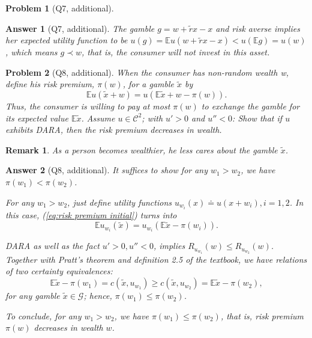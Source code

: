 \documentclass{article}
\newtheorem*{ans}{Answer}
\newtheorem*{prob}{{\bf Problem}}
\newtheorem{rem}{\bf Remark}
\newcommand{\1}{{\bf 1}}
\newcommand{\bbE}{\mathbb{E}}
\newcommand{\cC}{\mathcal{C}}
\newcommand{\cG}{\mathcal{G}}
\newcommand{\0}{{\mathbf{0}}}
\newcommand{\<}{\langle}
\renewcommand{\>}{\rangle}
\begin{document}
\begin{prob}[Q7, additional]
\end{prob}

\begin{ans}[Q7, additional] The gamble $g = w + \tilde r x -x $ and risk averse implies her expected utility function to be $ u(g) = \bbE u \left( w + \tilde r x -x \right) <  u(\bbE g ) = u(w)$, which means $g \prec w $, that is, the consumer will not invest in this asset.
\end{ans}

\begin{prob}[Q8, additional]When the consumer has non-random wealth w, define his risk premium, $\pi(w)$, for
	a gamble $\tilde x$ by
\begin{equation}	\bbE u(\tilde x + w) = u (\bbE \tilde x + w  - \pi (w)) . \label{eq:risk premium initial}
\end{equation}
	Thus, the consumer is willing to pay at most $\pi(w)$ to exchange the gamble for
	its expected value $\bbE\tilde x$. Assume $u \in \cC^2$; with $u' > 0$ and $u'' < 0$: Show that if $u$
	exhibits DARA, then the risk premium decreases in wealth. 
\end{prob}
\begin{rem}
	As a person becomes wealthier, he less cares about the gamble $\tilde x$.
\end{rem}
\begin{ans}[Q8, additional] It suffices to show for any $w_1 >w_2$, we have $ \pi(w_1) < \pi (w_2)$.

For any $w_1 >w_2$, just define utility functions $u_{w_i}(x) \doteq u(x+w_i), i =1,2$. In this case, (\ref{eq:risk premium initial}) turns into
$$
\bbE u_{w_i}(\tilde x ) = u_{w_i} (\bbE \tilde x    - \pi (w_i)) . 
$$

 DARA as well as the fact $u'>0, u''<0$, implies $R_{u_{w_1}}(w) \le R_{u_{w_2}}(w)$. Together with Pratt's theorem and definition 2.5 of the textbook, we have relations of two certainty equivalences:
$$ \bbE \tilde x - \pi(w_1 ) = c(\tilde x,u_{w_1 }) \ge c(\tilde x,u_{w_2}) = \bbE \tilde x - \pi(w_2),$$
 for any gamble $\tilde x \in \cG$; hence, $  \pi(w_1) \le \pi(w_2) $.
	
To conclude, for any $w_1 > w_2$, we have $\pi (w_1) \le \pi(w_2)$, that is, risk premium $\pi(w)$ decreases in wealth $w$.
	
\end{ans}
\end{document}
